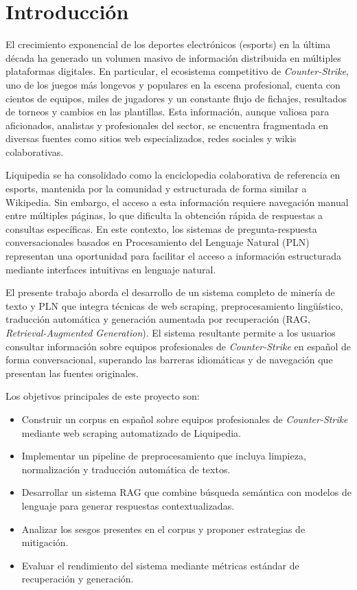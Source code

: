 ﻿\chapter{Introducción}
\label{ch:introduccion}


El crecimiento exponencial de los deportes electrónicos (esports) en la última década ha generado un volumen masivo de información distribuida en múltiples plataformas digitales. En particular, el ecosistema competitivo de \textit{Counter-Strike}, uno de los juegos más longevos y populares en la escena profesional, cuenta con cientos de equipos, miles de jugadores y un constante flujo de fichajes, resultados de torneos y cambios en las plantillas. Esta información, aunque valiosa para aficionados, analistas y profesionales del sector, se encuentra fragmentada en diversas fuentes como sitios web especializados, redes sociales y wikis colaborativas.


Liquipedia se ha consolidado como la enciclopedia colaborativa de referencia en esports, mantenida por la comunidad y estructurada de forma similar a Wikipedia. Sin embargo, el acceso a esta información requiere navegación manual entre múltiples páginas, lo que dificulta la obtención rápida de respuestas a consultas específicas. En este contexto, los sistemas de pregunta-respuesta conversacionales basados en Procesamiento del Lenguaje Natural (PLN) representan una oportunidad para facilitar el acceso a información estructurada mediante interfaces intuitivas en lenguaje natural.

El presente trabajo aborda el desarrollo de un sistema completo de minería de texto y PLN que integra técnicas de web scraping, preprocesamiento lingüístico, traducción automática y generación aumentada por recuperación (RAG, \textit{Retrieval-Augmented Generation}). El sistema resultante permite a los usuarios consultar información sobre equipos profesionales de \textit{Counter-Strike} en español de forma conversacional, superando las barreras idiomáticas y de navegación que presentan las fuentes originales.


Los objetivos principales de este proyecto son:

\begin{itemize}
    \item Construir un corpus en español sobre equipos profesionales de \textit{Counter-Strike} mediante web scraping automatizado de Liquipedia.
    \item Implementar un pipeline de preprocesamiento que incluya limpieza, normalización y traducción automática de textos.
    \item Desarrollar un sistema RAG que combine búsqueda semántica con modelos de lenguaje para generar respuestas contextualizadas.
    \item Analizar los sesgos presentes en el corpus y proponer estrategias de mitigación.
    \item Evaluar el rendimiento del sistema mediante métricas estándar de recuperación y generación.
\end{itemize}


